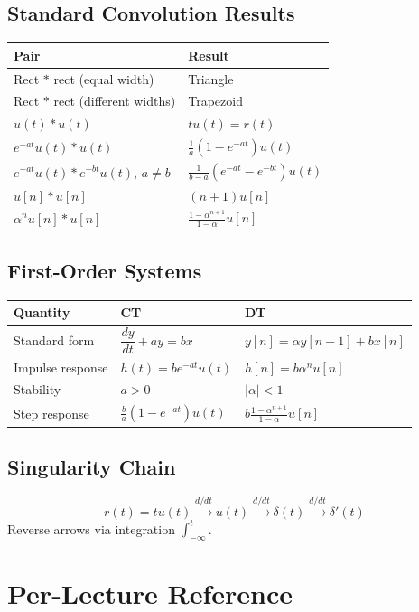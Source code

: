 \documentclass[11pt]{article}
\newcommand{\Conv}{\ast}
\begin{document}
\subsection{Standard Convolution Results}
\begin{center}
\begin{tabular}{|l|l|}
\hline
Pair & Result\\
\hline
Rect $\Conv$ rect (equal width) & Triangle\\
Rect $\Conv$ rect (different widths) & Trapezoid\\
$u(t)\Conv u(t)$ & $tu(t)=r(t)$\\
$e^{-at}u(t)\Conv u(t)$ & $\tfrac{1}{a}(1-e^{-at})u(t)$\\
$e^{-at}u(t)\Conv e^{-bt}u(t)$, $a\ne b$ & $\tfrac{1}{b-a}(e^{-at}-e^{-bt})u(t)$\\
$u[n]\Conv u[n]$ & $(n+1)u[n]$\\
$\alpha^n u[n]\Conv u[n]$ & $\tfrac{1-\alpha^{n+1}}{1-\alpha}u[n]$\\
\hline
\end{tabular}
\end{center}

\subsection{First-Order Systems}
\begin{center}
\begin{tabular}{|l|l|l|}
\hline
Quantity & CT & DT\\
\hline
Standard form & $\dfrac{dy}{dt}+ay = bx$ & $y[n]=\alpha y[n-1]+bx[n]$\\
Impulse response & $h(t) = be^{-at}u(t)$ & $h[n] = b\alpha^n u[n]$\\
Stability & $a>0$ & $|\alpha|<1$\\
Step response & $\tfrac{b}{a}(1-e^{-at})u(t)$ & $b\tfrac{1-\alpha^{n+1}}{1-\alpha}u[n]$\\
\hline
\end{tabular}
\end{center}

\subsection{Singularity Chain}
\[
r(t) = tu(t) \xrightarrow{d/dt} u(t) \xrightarrow{d/dt} \delta(t) \xrightarrow{d/dt} \delta'(t)
\]
Reverse arrows via integration $\int_{-\infty}^t$.

\section{Per-Lecture Reference}
\end{document}
